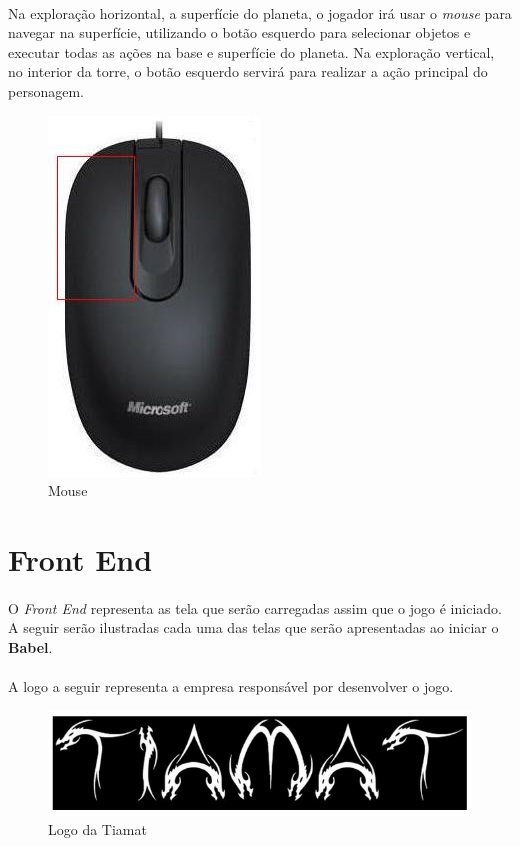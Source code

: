 \documentclass[11pt]{article} %
\begin{document}
\paragraph{}Na exploração horizontal, a superfície do planeta, o jogador irá usar o \textit{mouse} para navegar na superfície, utilizando o botão esquerdo para selecionar objetos e executar todas as ações na base e superfície do planeta. Na exploração vertical, no interior da torre, o botão esquerdo servirá para realizar a ação principal do personagem.

\begin{figure}[!htp]
\centering
\includegraphics[scale=0.4]{res/mouse.jpg}
\caption{Mouse}
\label{Mouse}
\end{figure}

\section{Front End}

\paragraph{} O \textit{Front End} representa as tela que serão carregadas assim que o jogo é iniciado. A seguir serão ilustradas cada uma das telas que serão apresentadas ao iniciar o \textbf{Babel}.

\paragraph{} A logo a seguir representa a empresa responsável por desenvolver o jogo.

\begin{figure}[!htp]
\centering
\includegraphics[scale=0.6]{res/tiamat_logo.png}
\caption{Logo da Tiamat}
\label{Logo da Tiamat}
\end{figure}
\end{document}
